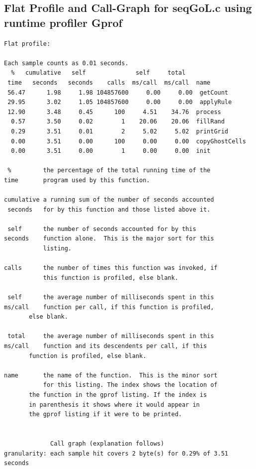\documentclass[11pt]{article} %
\begin{document}
\subsection{Flat Profile and Call-Graph for seqGoL.c using runtime profiler Gprof}
\begingroup
\fontsize{10pt}{8pt}
\begin{verbatim}
Flat profile:

Each sample counts as 0.01 seconds.
  %   cumulative   self              self     total           
 time   seconds   seconds    calls  ms/call  ms/call  name    
 56.47      1.98     1.98 104857600     0.00     0.00  getCount
 29.95      3.02     1.05 104857600     0.00     0.00  applyRule
 12.90      3.48     0.45      100     4.51    34.76  process
  0.57      3.50     0.02        1    20.06    20.06  fillRand
  0.29      3.51     0.01        2     5.02     5.02  printGrid
  0.00      3.51     0.00      100     0.00     0.00  copyGhostCells
  0.00      3.51     0.00        1     0.00     0.00  init

 %         the percentage of the total running time of the
time       program used by this function.

cumulative a running sum of the number of seconds accounted
 seconds   for by this function and those listed above it.

 self      the number of seconds accounted for by this
seconds    function alone.  This is the major sort for this
           listing.

calls      the number of times this function was invoked, if
           this function is profiled, else blank.
 
 self      the average number of milliseconds spent in this
ms/call    function per call, if this function is profiled,
	   else blank.

 total     the average number of milliseconds spent in this
ms/call    function and its descendents per call, if this 
	   function is profiled, else blank.

name       the name of the function.  This is the minor sort
           for this listing. The index shows the location of
	   the function in the gprof listing. If the index is
	   in parenthesis it shows where it would appear in
	   the gprof listing if it were to be printed.


		     Call graph (explanation follows)
granularity: each sample hit covers 2 byte(s) for 0.29% of 3.51 seconds


\end{verbatim}
\end{document}
